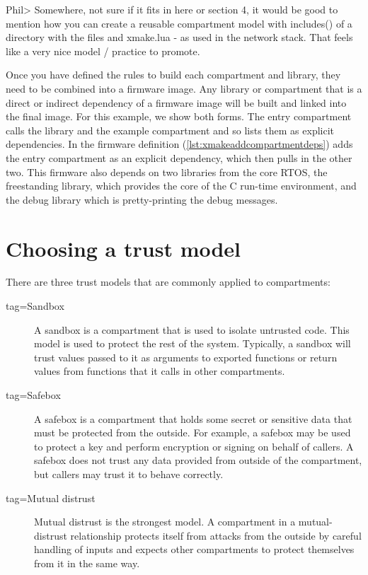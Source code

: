 Phil> Somewhere, not sure if it fits in here or section 4, it would be good to mention how you can create a reusable compartment model with includes() of a directory with the files and xmake.lua - as used in the network stack. That feels like a very nice model / practice to promote. 

Once you have defined the rules to build each compartment and library, they need to be combined into a firmware image.
Any library or compartment that is a direct or indirect dependency of a firmware image will be built and linked into the final image.
For this example, we show both forms.
The entry compartment calls the library and the example compartment and so lists them as explicit dependencies.
In the firmware definition (\ref{lst:xmakeaddcompartmentdeps}) adds the entry compartment as an explicit dependency, which then pulls in the other two.
This firmware also depends on two libraries from the core RTOS, the freestanding library, which provides the core of the C run-time environment, and the debug library which is pretty-printing the debug messages.

\lualisting[filename=examples/library_or_compartment/xmake.lua,marker=compartments_as_dependencies,label=lst:xmakeaddcompartmentdeps,caption="Build system code for adding dependencies on compartment and library targets"]{}

\section{Choosing a trust model}

There are three trust models that are commonly applied to compartments:

\begin{description}
	\item[tag=Sandbox]{ A sandbox is a compartment that is used to isolate
		untrusted code.
		This model is used to protect the rest of the system.
		Typically, a sandbox will trust values passed to it as arguments to exported functions or return values from functions that it calls in other compartments.}
		\item[tag=Safebox]{ A safebox is a compartment that holds some secret or sensitive data that must be protected from the outside.
		For example, a safebox may be used to protect a key and perform encryption or signing on behalf of callers.
		A safebox does not trust any data provided from outside of the compartment, but callers may trust it to behave correctly.}
	\item[tag=Mutual distrust]{ Mutual distrust is the strongest model.
		A compartment in a mutual-distrust relationship protects itself from attacks from the outside by careful handling of inputs and expects other compartments to protect themselves from it in the same way.}
\end{description}

